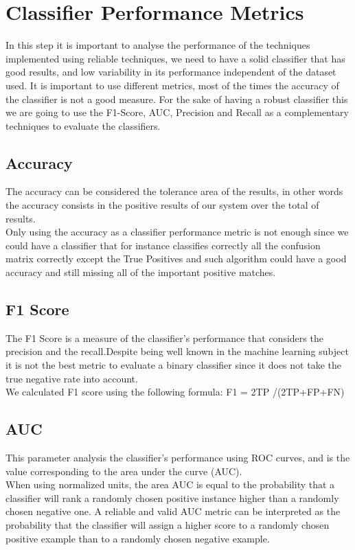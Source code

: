 \documentclass[english, a4paper, 12pt]{article}
\newcommand{\tab}{\hspace*{2em}}
\begin{document}
\section{Classifier Performance Metrics}
\tab In this step it is important to analyse the performance of the techniques implemented using reliable techniques, we need to have a solid classifier that has good results, and low variability in its performance independent of the dataset used. It is important to use different metrics, most of the times the accuracy of the classifier
is not a good measure. For the sake of having a robust classifier this we are going to use the F1-Score, AUC, Precision and Recall as a complementary techniques to evaluate the classifiers.
\subsection{Accuracy}
\tab The accuracy can be considered the tolerance area of the results, in other words the accuracy consists in the positive results of our system over the total of results.\\
\tab Only using the accuracy as a classifier performance metric is not enough since we could have a classifier that for instance classifies correctly all the confusion matrix correctly except the True Positives and such algorithm could have a good accuracy and still missing all of the important positive matches.
\subsection{F1 Score}
\tab The F1 Score is a measure of the classifier's performance that considers the precision and the recall.Despite being well known in the machine learning subject it is not the best metric to evaluate a binary classifier since it does not take the true negative rate into account.\\
\tab We calculated F1 score using the following formula: F1 = 2TP /(2TP+FP+FN)
\subsection{AUC}
\tab This parameter analysis the classifier's performance using ROC curves, and is the value corresponding to the area under the curve (AUC).\\
\tab When using normalized units, the area AUC is equal to the probability that a classifier will rank a randomly chosen positive instance higher than a randomly chosen negative one.
A reliable and valid AUC metric can be interpreted as the probability that the classifier will assign a higher score to a randomly chosen positive example than to a randomly chosen negative example.
\end{document}
